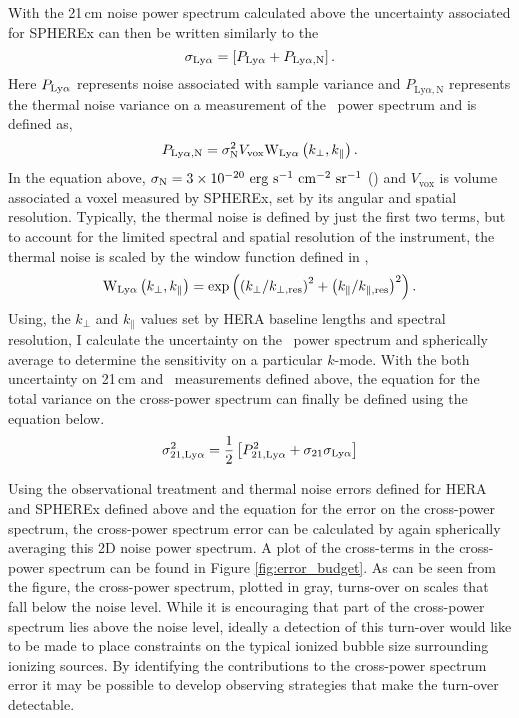 With the 21\,cm noise power spectrum calculated above the uncertainty associated for SPHEREx can then be written similarly to the
\begin{equation}
  \sigma_{\rm Ly\alpha} = \left[ P_{\rm Ly\alpha} + P_{\textrm{Ly}\alpha, \textrm{N}} \right].
\end{equation}
Here $P_{\rm Ly\alpha}$ represents noise associated with sample variance and
 $P_{\textrm{Ly}\alpha, \textrm{N}}$ represents the thermal noise variance
on a measurement of the \lya\ power spectrum and is defined as,
\begin{equation}
P_{\textrm{Ly}\alpha, \textrm{N}} = \sigma_{\rm N}^2 V_{\text{vox}} \textrm{W}_{\rm Ly\alpha}\left(k_{\perp}, k_{\parallel}\right).
\end{equation}
In the equation above, $\sigma_{\rm N} = 3 \times 10^{-20} \ {\rm erg \ s^{-1} \ cm^{-2} \ sr^{-1}}$ (\cite{2016arXiv160607039D})
and $V_{\text{vox}}$ is volume associated a voxel measured by SPHEREx,
set by its angular and spatial resolution.
Typically, the thermal noise is defined by just the first two terms, but to account for
the limited spectral and spatial resolution of the instrument, the thermal noise
is scaled by the window function defined in \cite{2011ApJ...741...70L},
\begin{equation}
  \textrm{W}_{\rm Ly\alpha}\left( k_{\perp}, k_{\parallel} \right) = \exp \left(\left( k_{\perp} / k_{\perp, \textrm{res}}\right)^2 + \left( k_{\parallel} / k_{\parallel, \textrm{res}}\right)^2\right).
\end{equation}
Using, the $k_{\perp}$ and $k_{\parallel}$ values set by HERA baseline lengths
and spectral resolution, I calculate the uncertainty on the \lya\ power spectrum
and spherically average to determine the sensitivity on a particular $k$-mode.
With the both uncertainty on 21\,cm and \lya\ measurements defined above, the equation
for the total variance on the cross-power spectrum can finally be defined using the equation below.
\begin{equation}
    \sigma^2_{21, \rm Ly\alpha} = \frac{1}{2} \left[ P^2_{21, \rm Ly\alpha} + \sigma_{21} \sigma_{\rm Ly\alpha} \right]
\end{equation}

Using the observational treatment and thermal noise errors defined for HERA and SPHEREx
defined above and the equation for the error on the cross-power spectrum, the cross-power spectrum
error can be calculated by again spherically averaging this 2D noise power spectrum. A plot of
the cross-terms in the cross-power spectrum can be found in Figure \ref{fig:error_budget}.
As can be seen from the figure, the cross-power spectrum, plotted in gray, turns-over
on scales that fall below the noise level. While it is encouraging that part of the cross-power
spectrum lies above the noise level, ideally a detection of this turn-over would
like to be made to place constraints on the typical ionized bubble size surrounding
ionizing sources. By identifying the contributions to the cross-power spectrum error
it may be possible to develop observing strategies that make the turn-over detectable.

